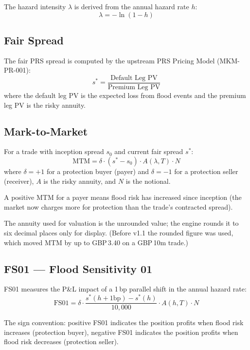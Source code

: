 \documentclass[11pt,a4paper]{article}
\begin{document}
The hazard intensity $\lambda$ is derived from the annual hazard rate $h$:
\begin{equation}
    \lambda = -\ln(1 - h)
\end{equation}

\subsection{Fair Spread}

The fair PRS spread is computed by the upstream PRS Pricing Model (MKM-PR-001):
\begin{equation}
    s^* = \frac{\text{Default Leg PV}}{\text{Premium Leg PV}}
\end{equation}
where the default leg PV is the expected loss from flood events and the premium leg PV is the risky annuity.

\subsection{Mark-to-Market}

For a trade with inception spread $s_0$ and current fair spread $s^*$:
\begin{equation}
    \text{MTM} = \delta \cdot (s^* - s_0) \cdot A(\lambda, T) \cdot N
\end{equation}
where $\delta = +1$ for a protection buyer (payer) and $\delta = -1$ for a protection seller (receiver), $A$ is the risky annuity, and $N$ is the notional.

A positive MTM for a payer means flood risk has increased since inception (the market now charges more for protection than the trade's contracted spread).

The annuity used for valuation is the unrounded value; the engine rounds it to six
decimal places only for display. (Before v1.1 the rounded figure was used, which moved
MTM by up to GBP\,3.40 on a GBP\,10m trade.)

\subsection{FS01 --- Flood Sensitivity 01}

FS01 measures the P\&L impact of a 1\,bp parallel shift in the annual hazard rate:
\begin{equation}
    \text{FS01} = \delta \cdot \frac{s^*(h + 1\text{bp}) - s^*(h)}{10{,}000} \cdot A(h, T) \cdot N
\end{equation}

The sign convention: positive FS01 indicates the position profits when flood risk increases (protection buyer), negative FS01 indicates the position profits when flood risk decreases (protection seller).
\end{document}
